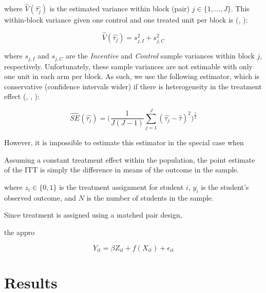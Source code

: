 \documentclass[12pt]{article}
\begin{document}
where $\hat{V}(\hat{\tau_j})$ is the estimated variance within block (pair) $j\in \{1,...,J\}$. This within-block variance given one control and one treated unit per block is (\cite{ir2015}, \cite{ai2017}):

\begin{equation} \label{v_block}
	\hat{V}(\hat{\tau_j}) = s_{j, I}^2 + s_{j, C}^2
\end{equation}

where $s_{j, I}$ and $s_{j, C}$ are the \textit{Incentive} and \textit{Control} sample variances within block $j$, respectively. Unfortunately, these sample variances are not estimable with only one unit in each arm per block. As such, we use the following estimator, which is conservative (confidence intervals wider) if there is heterogeneity in the treatment effect (\cite{imai2008}, \cite{ai2015}, \cite{ai2017}):

\begin{equation} \label{se_imai}
	\hat{SE}(\hat{\tau_j}) = \Big(\frac{1}{J(J-1)}\sum_{j=1}^{J} (\hat{\tau_j} - \hat{\tau})^2 \Big)^\frac{1}{2}
\end{equation}

However, it is impossible to estimate this estimator in the special case when 

Assuming a constant treatment effect within the population, the point estimate of the ITT is simply the difference in means of the outcome in the sample. 



where $z_i \in \{0,1\}$ is the treatment assignment for student $i$, $y_i$ is the student's observed outcome, and $N$ is the number of students in the sample. 

Since treatment is assigned using a matched pair design,

 the appro

\begin{equation}
	Y_{it} = \beta Z_{it} + f(X_{it}) + \epsilon_{it}
\end{equation}





\section{Results} \label{results}

\end{document}
